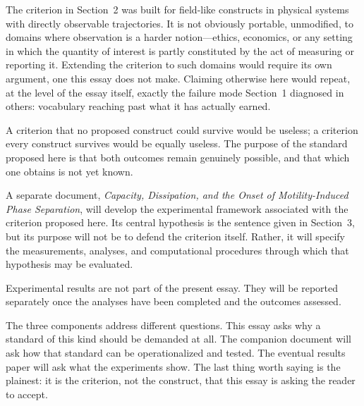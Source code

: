 \documentclass[11pt]{article}
\begin{document}
The criterion in Section~2 was built for field-like constructs in physical systems with directly observable trajectories. It is not obviously portable, unmodified, to domains where observation is a harder notion---ethics, economics, or any setting in which the quantity of interest is partly constituted by the act of measuring or reporting it. Extending the criterion to such domains would require its own argument, one this essay does not make. Claiming otherwise here would repeat, at the level of the essay itself, exactly the failure mode Section~1 diagnosed in others: vocabulary reaching past what it has actually earned.

A criterion that no proposed construct could survive would be useless; a criterion every construct survives would be equally useless. The purpose of the standard proposed here is that both outcomes remain genuinely possible, and that which one obtains is not yet known.

A separate document, \emph{Capacity, Dissipation, and the Onset of Motility-Induced Phase Separation}, will develop the experimental framework associated with the criterion proposed here. Its central hypothesis is the sentence given in Section~3, but its purpose will not be to defend the criterion itself. Rather, it will specify the measurements, analyses, and computational procedures through which that hypothesis may be evaluated.

Experimental results are not part of the present essay. They will be reported separately once the analyses have been completed and the outcomes assessed.

The three components address different questions. This essay asks why a standard of this kind should be demanded at all. The companion document will ask how that standard can be operationalized and tested. The eventual results paper will ask what the experiments show. The last thing worth saying is the plainest: it is the criterion, not the construct, that this essay is asking the reader to accept.
\end{document}
